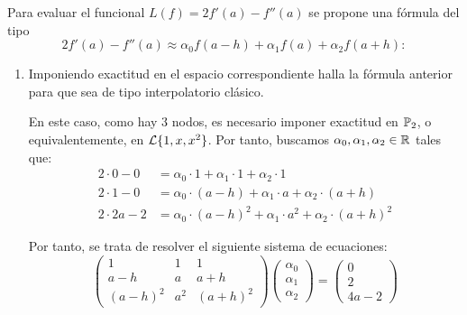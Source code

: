 \begin{ejercicio}\label{ej:2.2.2}
    Para evaluar el funcional $L(f) = 2f'(a) - f''(a)$ se propone una fórmula del tipo
    \[
    2f'(a) - f''(a) \approx \alpha_0 f(a - h) + \alpha_1 f(a) + \alpha_2 f(a + h) :
    \]
    \begin{enumerate}
        \item Imponiendo exactitud en el espacio correspondiente halla la fórmula anterior para que sea de tipo interpolatorio clásico.
        
        En este caso, como hay $3$ nodos, es necesario imponer exactitud en $\mathbb{P}_2$, o equivalentemente, en $\mathcal{L}\{1, x, x^2\}$. Por tanto, buscamos $\alpha_0,\alpha_1,\alpha_2\in\mathbb{R}$ tales que:
        \begin{align*}
            2\cdot 0 - 0 &= \alpha_0\cdot 1 + \alpha_1\cdot 1 + \alpha_2\cdot 1 \\
            2\cdot 1 - 0 &= \alpha_0\cdot (a-h) + \alpha_1\cdot a + \alpha_2\cdot (a+h) \\
            2\cdot 2a - 2 &= \alpha_0\cdot (a-h)^2 + \alpha_1\cdot a^2 + \alpha_2\cdot (a+h)^2
        \end{align*}

        Por tanto, se trata de resolver el siguiente sistema de ecuaciones:
        \begin{equation*}
            \begin{pmatrix}
                1 & 1 & 1 \\
                a-h & a & a+h \\
                (a-h)^2 & a^2 & (a+h)^2
            \end{pmatrix}
            \begin{pmatrix}
                \alpha_0 \\
                \alpha_1 \\
                \alpha_2
            \end{pmatrix}=
            \begin{pmatrix}
                0 \\
                2 \\
                4a-2
            \end{pmatrix}
        \end{equation*}


\end{enumerate}
\end{ejercicio}
